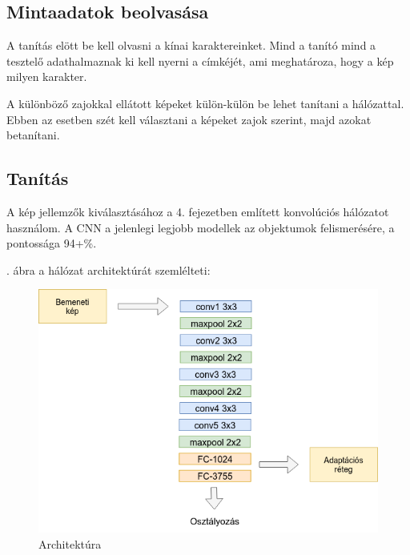 \subsection{Mintaadatok beolvasása}

A tanítás elött be kell olvasni a kínai karaktereinket. Mind a tanító mind a tesztelő adathalmaznak ki kell nyerni a címkéjét, ami meghatároza, hogy a kép milyen karakter.

A különböző zajokkal ellátott képeket külön-külön be lehet tanítani a hálózattal. Ebben az esetben szét kell választani a képeket zajok szerint, majd azokat betanítani.

\subsection{Tanítás}

A kép jellemzők kiválasztásához a 4. fejezetben említett konvolúciós hálózatot használom. A CNN a jelenlegi legjobb modellek az objektumok felismerésére, a pontossága 94+\%.

. ábra a hálózat architektúrát szemlélteti:

\begin{figure}[h]
	\centering
	\includegraphics[scale=0.45]{images/architecture}
	\caption{Architektúra}
	\label{fig:arch}
\end{figure}

